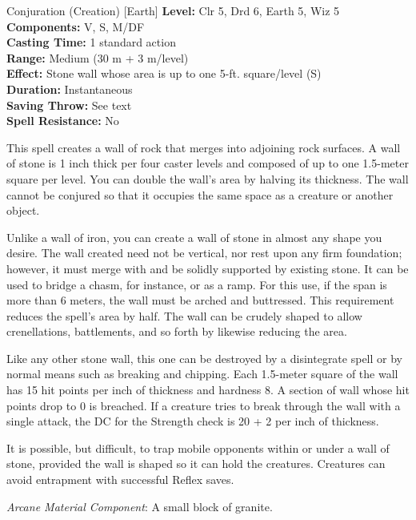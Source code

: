 {Conjuration (Creation) [Earth]}
{
	\textbf{Level:}
	Clr 5, Drd 6, Earth 5, Wiz 5\\
	\textbf{Components:}
	V, S, M/DF\\
	\textbf{Casting Time:}
	1 standard action\\
	\textbf{Range:}
	Medium (30 m + 3 m/level)\\
	\textbf{Effect:}
	Stone wall whose area is up to one 5-ft. square/level (S)\\
	\textbf{Duration:}
	Instantaneous\\
	\textbf{Saving Throw:}
	See text\\
	\textbf{Spell Resistance:}
	No\\
}
{
	This spell creates a wall of rock that merges into adjoining rock surfaces. A wall of stone is 1 inch thick per four caster levels and composed of up to one 1.5-meter square per level. You can double the wall's area by halving its thickness. The wall cannot be conjured so that it occupies the same space as a creature or another object.

	Unlike a wall of iron, you can create a wall of stone in almost any shape you desire. The wall created need not be vertical, nor rest upon any firm foundation; however, it must merge with and be solidly supported by existing stone. It can be used to bridge a chasm, for instance, or as a ramp. For this use, if the span is more than 6 meters, the wall must be arched and buttressed. This requirement reduces the spell's area by half. The wall can be crudely shaped to allow crenellations, battlements, and so forth by likewise reducing the area.

	Like any other stone wall, this one can be destroyed by a disintegrate spell or by normal means such as breaking and chipping. Each 1.5-meter square of the wall has 15 hit points per inch of thickness and hardness 8. A section of wall whose hit points drop to 0 is breached. If a creature tries to break through the wall with a single attack, the DC for the Strength check is 20 + 2 per inch of thickness.

	It is possible, but difficult, to trap mobile opponents within or under a wall of stone, provided the wall is shaped so it can hold the creatures. Creatures can avoid entrapment with successful Reflex saves.

	\textit{Arcane Material Component}:
	A small block of granite.

}
